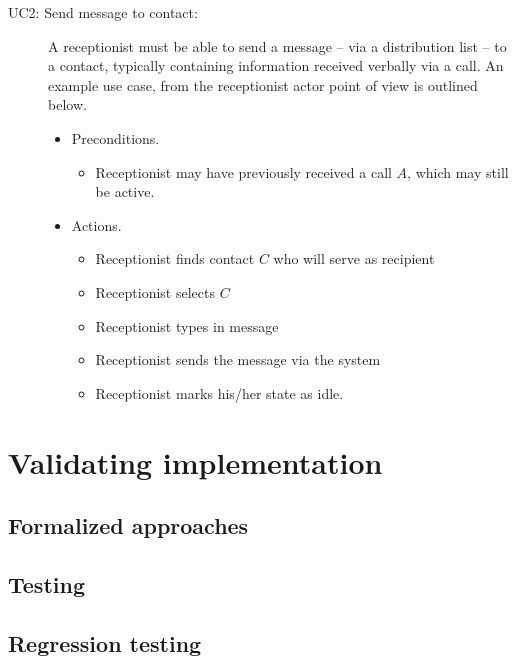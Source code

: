 \begin{description}
  \item[UC2: Send message to contact:] A receptionist must be able to send a message -- via a distribution list -- to a contact, typically containing information received verbally via a call. An example use case, from the receptionist actor point of view is outlined below.
  \begin{itemize}
    \item Preconditions.
    \begin{itemize}
      \item Receptionist may have previously received a call $A$, which may still be active.
    \end{itemize}
    \item Actions.
    \begin{itemize}
      \item Receptionist finds contact $C$ who will serve as recipient
      \item Receptionist selects $C$
      \item Receptionist types in message
      \item Receptionist sends the message via the system
      \item Receptionist marks his/her state as idle.
    \end{itemize}
  \end{itemize}
\end{description}


\chapter{Validating implementation}

\section{Formalized approaches}
\section{Testing}

\section{Regression testing}

